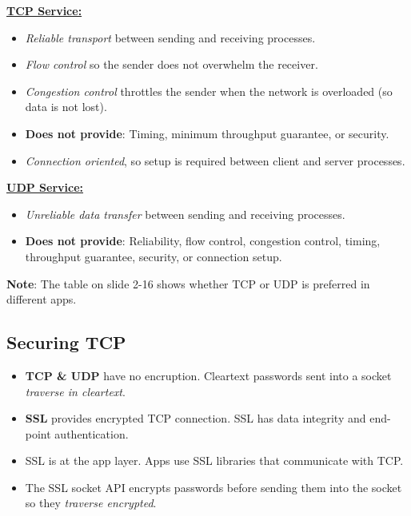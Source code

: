 \documentclass{article}
\begin{document}
\begin{multicols}{2}
\underline{\bf TCP Service:}
\begin{itemize}
\item {\it Reliable transport} between sending and receiving processes.
\item {\it Flow control} so the sender does not overwhelm the receiver.
\item {\it Congestion control} throttles the sender when the network is overloaded (so data is not lost).
\item {\bf Does not provide}: Timing, minimum throughput guarantee, or security.
\item {\it Connection oriented}, so setup is required between client and server processes.
\end{itemize}

\columnbreak

\underline{\bf UDP Service:}
\begin{itemize}
\item {\it Unreliable data transfer} between sending and receiving processes.
\item {\bf Does not provide}: Reliability, flow control, congestion control, timing, throughput guarantee, security, or connection setup.
\end{itemize}
\end{multicols}
{\bf Note}: The table on slide 2-16 shows whether TCP or UDP is preferred in different apps.

\clearpage

\subsection{Securing TCP}

\begin{itemize}
\item {\bf TCP \& UDP} have no encruption. Cleartext passwords sent into a socket {\it traverse in cleartext}.
\item {\bf SSL} provides encrypted TCP connection. SSL has data integrity and end-point authentication.
\item SSL is at the app layer. Apps use SSL libraries that communicate with TCP.
\item The SSL socket API encrypts passwords before sending them into the socket so they {\it traverse encrypted}.
\end{itemize}
\end{document}
